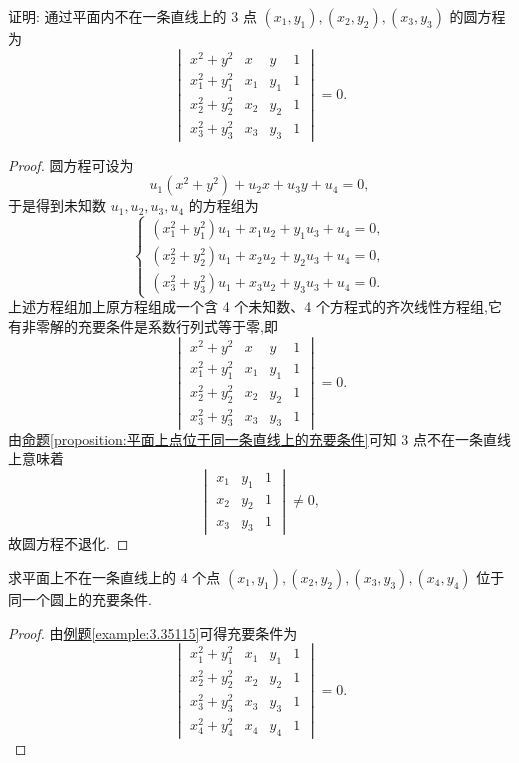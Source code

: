 \documentclass[../../main.tex]{subfiles}%
\begin{document}
\begin{example}\label{example:3.35115}
证明: 通过平面内不在一条直线上的 3 点 \((x_1,y_1),(x_2,y_2),(x_3,y_3)\) 的圆方程为
\[
\begin{vmatrix}
x^2 + y^2&x&y&1\\
x_1^2 + y_1^2&x_1&y_1&1\\
x_2^2 + y_2^2&x_2&y_2&1\\
x_3^2 + y_3^2&x_3&y_3&1
\end{vmatrix}=0.
\]
\end{example}
\begin{proof}
圆方程可设为
\[
u_1(x^2 + y^2)+u_2x + u_3y + u_4 = 0,
\]
于是得到未知数 \(u_1,u_2,u_3,u_4\) 的方程组为
\[
\begin{cases}
(x_1^2 + y_1^2)u_1 + x_1u_2 + y_1u_3 + u_4 = 0,\\
(x_2^2 + y_2^2)u_1 + x_2u_2 + y_2u_3 + u_4 = 0,\\
(x_3^2 + y_3^2)u_1 + x_3u_2 + y_3u_3 + u_4 = 0.
\end{cases}
\]
上述方程组加上原方程组成一个含 4 个未知数、4 个方程式的齐次线性方程组,它有非零解的充要条件是系数行列式等于零,即
\[
\begin{vmatrix}
x^2 + y^2&x&y&1\\
x_1^2 + y_1^2&x_1&y_1&1\\
x_2^2 + y_2^2&x_2&y_2&1\\
x_3^2 + y_3^2&x_3&y_3&1
\end{vmatrix}=0.
\]
由\hyperref[proposition:平面上点位于同一条直线上的充要条件]{命题\ref{proposition:平面上点位于同一条直线上的充要条件}}可知 3 点不在一条直线上意味着
\[
\begin{vmatrix}
x_1&y_1&1\\
x_2&y_2&1\\
x_3&y_3&1
\end{vmatrix}\neq0,
\]
故圆方程不退化.  
\end{proof}

\begin{proposition}\label{proposition:平面上4点共圆的充要条件}
求平面上不在一条直线上的 4 个点 \((x_1,y_1),(x_2,y_2),(x_3,y_3),(x_4,y_4)\) 位于同一个圆上的充要条件.
\end{proposition}
\begin{proof}
由\hyperref[example:3.35115]{例题\ref{example:3.35115}}可得充要条件为
\[
\begin{vmatrix}
x_1^2 + y_1^2&x_1&y_1&1\\
x_2^2 + y_2^2&x_2&y_2&1\\
x_3^2 + y_3^2&x_3&y_3&1\\
x_4^2 + y_4^2&x_4&y_4&1
\end{vmatrix}=0.
\]
\end{proof}
\end{document}

